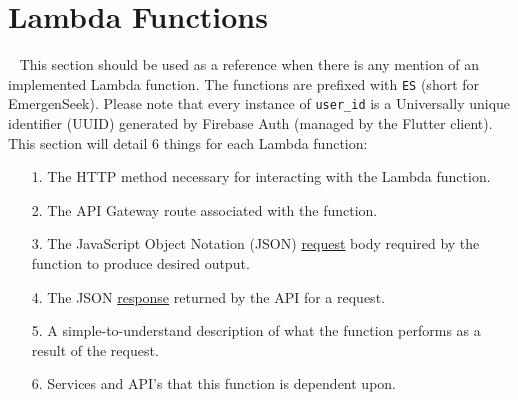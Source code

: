 \documentclass[10pt, a4paper]{article}
\begin{document}
\section{Lambda Functions}
\label{sec:lf}
\par ~ This section should be used as a reference when there is any mention of an implemented Lambda function. The functions are prefixed with \texttt{ES} (short for EmergenSeek). Please note that every instance of \texttt{user\_id} is a Universally unique identifier (UUID) generated by Firebase Auth (managed by the Flutter client). This section will detail 6 things for each Lambda function:
	\begin{enumerate}
		\item[1.] The HTTP method necessary for interacting with the Lambda function.
		\item[2.] The API Gateway route associated with the function.
		\item[3.] The JavaScript Object Notation (JSON) \underline{request} body required by the function to produce desired output.
		\item[4.] The JSON \underline{response} returned by the API for a request.
		\item[5.] A simple-to-understand description of what the function performs as a result of the request.
		\item[6.] Services and API's that this function is dependent upon.
	\end{enumerate}
\end{document}
